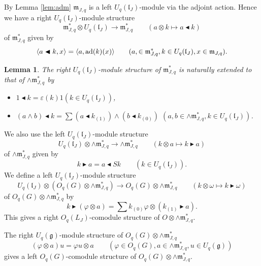 \documentclass[a4paper, 12pt, leqno]{amsart}
\newtheorem{lemma}{{\sc Lemma}}[section]
\theoremstyle{definition}
\numberwithin{equation}{section}
\def\Gg{{\mathfrak{g}}}
\def\Gl{{\mathfrak{l}}}
\def\Gm{{\mathfrak{m}}}
\def\ad{{\mathop{\rm ad}\nolimits}}
\def\m{\Gm_{J,q}}
\def\K{U_q(\Gl_J)}
\def\al{\blacktriangleleft}
\def\ar{\blacktriangleright}
\begin{document}
By Lemma \ref{lem:adm} $\m$ is a left $\K$-module via the adjoint action.
Hence we have a right $\K$-module structure 
\begin{equation}
\m^*\otimes\K\to\m^*
\qquad(a\otimes k\mapsto a\al k)
\end{equation}
of $\m^*$ given by
\[
\langle a\al k,x\rangle=\langle a,\ad(k)(x)\rangle
\qquad(a,\in\m^*, k\in\K, x\in\m).
\]



\begin{lemma}
\label{lem:mK}
The right $\K$-module structure of $\m^*$ is naturally extended to that of $\wedge\m^*$ by
\begin{itemize}
\item[(a)]
$1\al k=\varepsilon(k)1$\quad$(k\in\K)$,
\item[(b)]
$(a\wedge b)\al k=\sum(a\al k_{(1)})\wedge(b\al k_{(0)})$
\quad
$(a, b\in\wedge\m^*, k\in\K)$.

\end{itemize}
\end{lemma}
We also use the left $\K$-module structure 
\begin{equation}
\K\otimes\wedge\m^*\to\wedge\m^*
\qquad(k\otimes a\mapsto k\ar a)
\end{equation}
of $\wedge\m^*$ given by
\[
k\ar a=a\al Sk
\qquad(k\in \K).
\]
We define a left $\K$-module structure 
\begin{equation}
\K\otimes(O_q(G)\otimes\wedge\m^*)\to O_q(G)\otimes\wedge\m^*
\qquad(k\otimes \omega\mapsto k\ar \omega)
\end{equation}
of $O_q(G)\otimes\wedge\m^*$ by
\[
k\ar(\varphi\otimes a)=\sum k_{(0)}\varphi\otimes (k_{(1)}\ar a).
\]
This gives a right $O_q(L_J)$-comodule structure of $O\otimes\wedge\m^*$.

The right $U_q(\Gg)$-module structure of 
$O_q(G)\otimes\wedge\m^*$
\begin{equation}
(\varphi\otimes a)u=
\varphi u\otimes a
\qquad(\varphi\in O_q(G), a\in\wedge\m^*, u\in U_q(\Gg))
\end{equation}
gives a left $O_q(G)$-comodule structure of 
$O_q(G)\otimes\wedge\m^*$.
\end{document}
